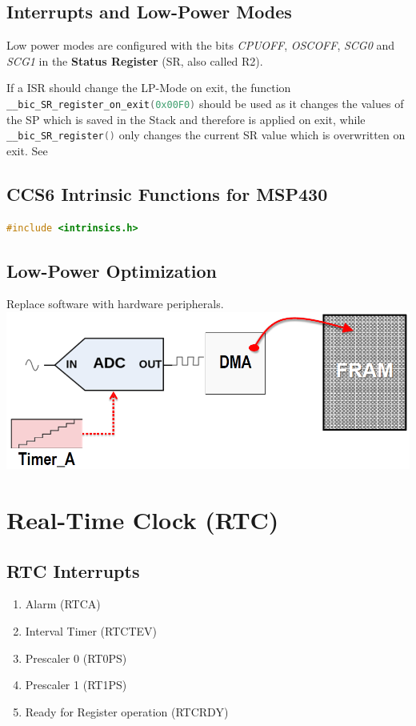 \subsection{Interrupts and Low-Power Modes}
Low power modes are configured with the bits \textit{CPUOFF}, \textit{OSCOFF}, \textit{SCG0} and \textit{SCG1} in the \textbf{Status Register} (SR, also called R2).

If a ISR should change the LP-Mode on exit, the function \lstinline[language=C]|__bic_SR_register_on_exit(0x00F0)| should be used as it changes the values of the SP which is saved in the Stack and therefore is applied on exit, while \lstinline[language=C]|__bic_SR_register()| only changes the current SR value which is overwritten on exit.
See 


\subsection{CCS6 Intrinsic Functions for MSP430}
\begin{lstlisting}[language=c]
	#include <intrinsics.h>
\end{lstlisting}

\subsection{Low-Power Optimization}
Replace software with hardware peripherals.
\includegraphics[width=0.8\columnwidth, center]{Images/LPM_replace_hw_with_sw.png}

\section{Real-Time Clock (RTC) }
\subsection{RTC Interrupts}
\begin{enumerate}
	\itemsep-.5em 
	\item Alarm (RTCA)
	\item Interval Timer (RTCTEV)
	\item Prescaler 0 (RT0PS)
	\item Prescaler 1 (RT1PS)
	\item Ready for Register operation (RTCRDY)
\end{enumerate}

